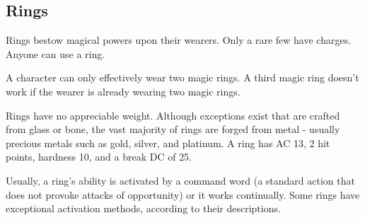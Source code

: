 \subsection{Rings}

Rings bestow magical powers upon their wearers. Only a rare few have charges. Anyone can use a ring.

A character can only effectively wear two magic rings. A third magic ring doesn't work if the wearer is already wearing two magic rings.

 Rings have no appreciable weight. Although exceptions exist that are crafted from glass or bone, the vast majority of rings are forged from metal - usually precious metals such as gold, silver, and platinum. A ring has AC 13, 2 hit points, hardness 10, and a break DC of 25.

 Usually, a ring's ability is activated by a command word (a standard action that does not provoke attacks of opportunity) or it works continually. Some rings have exceptional activation methods, according to their descriptions.

\begin{comment}
\begin{dtable}
\lcaption{Rings}
\begin{tabularx}{\columnwidth}{>{\lcol}X l}
Ring & Market Price \\
Protection \plus1 & 2,000 gp \\
Feather falling & 2,200 gp \\
Climbing & 2,500 gp \\
Jumping & 2,500 gp \\
Sustenance & 2,500 gp \\
Swimming & 2,500 gp \\
Mind shielding & 8,000 gp \\
Protection \plus2 & 8,000 gp \\
Climbing, improved & 10,000 gp \\
Jumping, improved & 10,000 gp \\
Swimming, improved & 10,000 gp \\
Energy resistance, minor & 12,000 gp \\
Protection \plus3 & 18,000 gp \\
Energy resistance, major & 28,000 gp \\
Protection \plus4 & 32,000 gp \\
Energy resistance, greater & 44,000 gp \\
Protection \plus5 & 50,000 gp \\
\end{tabularx}
\end{dtable}
\end{comment}

